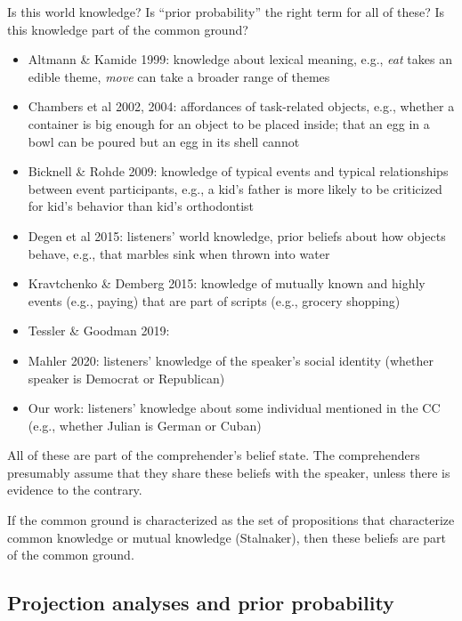 \documentclass[11pt,fleqn]{article}
\newcommand{\6}{\mbox{$[\hspace*{-.6mm}[$}}
\newcommand{\9}{\mbox{$]\hspace*{-.6mm}]$}}
\begin{document}
Is this world knowledge? Is ``prior probability'' the right term for all of these? Is this knowledge part of the common ground?

\begin{itemize}

\item Altmann \& Kamide 1999: knowledge about lexical meaning, e.g., {\em eat} takes an edible theme, {\em move} can take a broader range of themes

\item Chambers et al 2002, 2004: affordances of task-related objects, e.g., whether a container is big enough for an object to be placed inside; that an egg in a bowl can be poured but an egg in its shell cannot

\item Bicknell \& Rohde 2009: knowledge of typical events and typical relationships between event participants, e.g., a kid's father is more likely to be criticized for kid's behavior than kid's orthodontist

\item Degen et al 2015: listeners' world knowledge, prior beliefs about how objects behave, e.g., that marbles sink when thrown into water

\item Kravtchenko \& Demberg 2015: knowledge of mutually known and highly events (e.g., paying) that are part of scripts (e.g., grocery shopping)

\item Tessler \& Goodman 2019: 

\item Mahler 2020: listeners' knowledge of the speaker's social identity (whether speaker is Democrat or Republican)

\item Our work: listeners' knowledge about some individual mentioned in the CC (e.g., whether Julian is German or Cuban)

\end{itemize}

All of these are part of the comprehender's belief state. The comprehenders presumably assume that they share these beliefs with the speaker, unless there is evidence to the contrary. 

If the common ground is characterized as the set of propositions that characterize common knowledge or mutual knowledge (Stalnaker), then these beliefs are part of the common ground.

\subsection{Projection analyses and prior probability}
\end{document}
